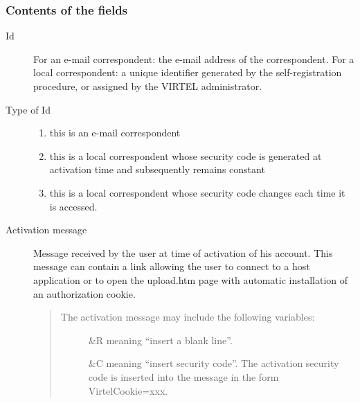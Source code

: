 \documentclass[letterpaper,10pt,english]{sphinxmanual}
\begin{document}
\begin{sphinxVerbatim}[commandchars=\\\{\}]
                                                 
                                              
\end{sphinxVerbatim}



\subsubsection{Contents of the fields}
\label{\detokenize{User_Guide:contents-of-the-fields}}\begin{description}
\item[{Id}] \leavevmode
For an e-mail correspondent: the e-mail address of the correspondent. For a local correspondent: a unique identifier generated by the self-registration procedure, or assigned by the VIRTEL administrator.

\item[{Type of Id}] \leavevmode\begin{enumerate}
\item {} 
this is an e-mail correspondent

\item {} 
this is a local correspondent whose security code is generated at activation time and subsequently remains constant

\item {} 
this is a local correspondent whose security code changes each time it is accessed.

\end{enumerate}

\item[{Activation message}] \leavevmode
Message received by the user at time of activation of his account. This message can contain a link allowing the user to connect to a host application or to open the upload.htm page with automatic installation of an authorization cookie.
\begin{quote}
\begin{description}
\item[{The activation message may include the following variables:}] \leavevmode
\&R meaning “insert a blank line”.

\&C meaning “insert security code”. The activation security code is inserted into the message in the form VirtelCookie=xxx.


\end{description}
\end{quote}
\end{description}
\end{document}
